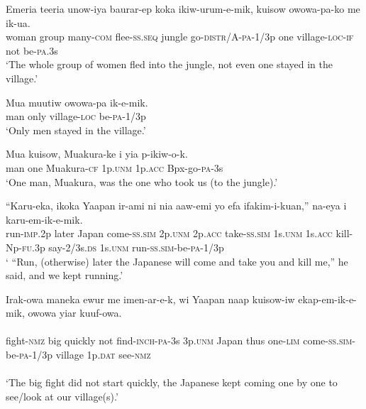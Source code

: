 {\ea\label{ex:a:x22}
\gll  Emeria  teeria  unow-iya  baurar-ep  koka   ikiw-urum-e-mik,  kuisow  owowa-pa-ko  me  ik-ua. \\
woman  group  many-\textsc{com}  flee-\textsc{ss.seq}  jungle go-\textsc{distr}/A-\textsc{pa}-1/3p  one  village-\textsc{loc}-\textsc{if}  not  be-\textsc{pa}.3s\\
\glt ‘The whole group of women fled into the jungle, not even one stayed in the village.’ \\
\z


\ea\label{ex:a:x23}
\gll  Mua  muutiw  owowa-pa  ik-e-mik. \\
man  only  village-\textsc{loc}  be-\textsc{pa}-1/3p \\
\glt ‘Only men stayed in the village.’ \\
\z


\ea\label{ex:a:x24}
\gll  Mua  kuisow,  Muakura-ke  i  yia  p-ikiw-o-k. \\
man  one  Muakura-\textsc{cf}  1p.\textsc{unm}  1p.\textsc{acc}  Bpx-go-\textsc{pa}-3s \\
\glt ‘One man, Muakura, was the one who took us (to the jungle).’ \\
\z


\ea\label{ex:a:x25}
\gll  “Karu-eka,  ikoka  Yaapan  ir-ami  ni  nia  aaw-emi  yo  efa  ifakim-i-kuan,”  na-eya i  karu-em-ik-e-mik. \\
run-\textsc{imp}.2p  later  Japan  come-\textsc{ss}.\textsc{sim}  2p.\textsc{unm}  2p.\textsc{acc}   take-\textsc{ss}.\textsc{sim}  1s.\textsc{unm}  1s.\textsc{acc}  kill-Np-\textsc{fu}.3p  say-2/3s.\textsc{ds} 1s.\textsc{unm}  run-\textsc{ss}.\textsc{sim}-be-\textsc{pa}-1/3p \\
\glt ‘ “Run, (otherwise) later the Japanese will come and take you and kill me,” he said, and we kept running.’ \\
\z


\ea\label{ex:a:x26}
\gll  Irak-owa  maneka  ewur  me  imen-ar-e-k,      wi  Yaapan  naap  kuisow-iw  ekap-em-ik-e-mik, owowa  yiar  kuuf-owa. \\ \\
fight-\textsc{nmz}  big  quickly  not  find-\textsc{inch}-\textsc{pa}-3s 3p.\textsc{unm}  Japan  thus  one-\textsc{lim}  come-\textsc{ss}.\textsc{sim}-be-\textsc{pa}-1/3p village  1p.\textsc{dat}  see-\textsc{nmz} \\\\
\glt ‘The big fight did not start quickly, the Japanese kept coming one by one to see/look at our village(s).’ \\
\z


}
